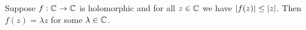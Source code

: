 \documentclass{homework}
\begin{document}
                                                                                                                                                                                                                                                                                  \begin{problem}\label{identity-dominate-entire}Suppose $f : \mathbb{C} \to \mathbb{C}$
                                                                                                                                                                                                                                                                                    is holomorphic and for all $z \in \mathbb{C}$ we have
                                                                                                                                                                                                                                                                                      $\left|f(z)\right| \leq \left|z\right|$.  Then $f(z) = \lambda z$ for some
                                                                                                                                                                                                                                                                                        $\lambda \in \mathbb{C}$.
                                                                                                                                                                                                                                                                                        \end{problem}
\end{document}
